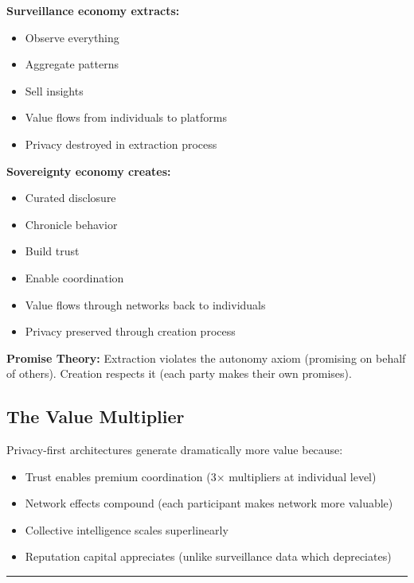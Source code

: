 \documentclass[
  11pt,
]{article}
\begin{document}
\textbf{Surveillance economy extracts:}

\begin{itemize}
\item
  Observe everything
\item
  Aggregate patterns
\item
  Sell insights
\item
  Value flows from individuals to platforms
\item
  Privacy destroyed in extraction process
\end{itemize}

\textbf{Sovereignty economy creates:}

\begin{itemize}
\item
  Curated disclosure
\item
  Chronicle behavior
\item
  Build trust
\item
  Enable coordination
\item
  Value flows through networks back to individuals
\item
  Privacy preserved through creation process
\end{itemize}

\textbf{Promise Theory:} Extraction violates the autonomy axiom
(promising on behalf of others). Creation respects it (each party makes
their own promises).

\subsection{The Value Multiplier}\label{the-value-multiplier}

Privacy-first architectures generate dramatically more value because:

\begin{itemize}
\item
  Trust enables premium coordination (3× multipliers at individual
  level)
\item
  Network effects compound (each participant makes network more
  valuable)
\item
  Collective intelligence scales superlinearly
\item
  Reputation capital appreciates (unlike surveillance data which
  depreciates)
\end{itemize}

\begin{center}\rule{0.5\linewidth}{0.5pt}\end{center}
\end{document}
